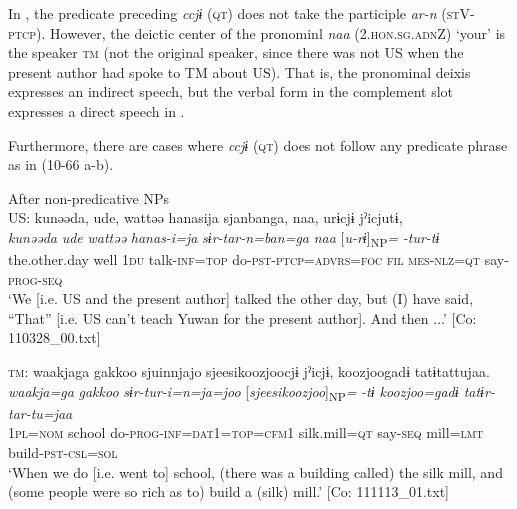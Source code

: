 In , the predicate preceding \textit{ccjɨ} (\textsc{qt}) does not take the participle \textit{ar-n} (\textsc{st}V-\textsc{ptcp}). However, the deictic center of the pronominl \textit{naa} (2.\textsc{hon}.\textsc{sg}.\textsc{adn}Z) ‘your’ is the speaker \textsc{tm} (not the original speaker, since there was not US when the present author had spoke to TM about US). That is, the pronominal deixis expresses an indirect speech, but the verbal form in the complement slot expresses a direct speech in .

  Furthermore, there are cases where \textit{ccjɨ} (\textsc{qt}) does not follow any predicate phrase as in (10-66 a-b).

\ea\label{ex:10.66}   After non-predicative NPs\\
  \ea  US: \glll kunəəda,  ude,  wattəə  hanasija  sjanbanga,   naa,  urɨcjɨ  jˀicjutɨ,\\
      \textit{kunəəda}  \textit{ude}  \textit{wattəə}  \textit{hanas-i=ja}  \textit{sɨr-tar-n=ban=ga}  \textit{naa}  [\textit{u-rɨ}]\textsubscript{NP}\textit{=}  \textit{-tur-tɨ}\\
      the.other.day  well  1\textsc{du}  talk-\textsc{inf}=\textsc{top}  do-\textsc{pst}-\textsc{ptcp}=\textsc{advrs}=\textsc{foc}  \textsc{fil}  \textsc{mes}-\textsc{nlz}=\textsc{qt}  say-\textsc{prog}-\textsc{seq}\\
      \glt       ‘We [i.e. US and the present author] talked the other day, but (I) have said, “That” [i.e. US can’t teach Yuwan for the present author]. And then ...’ [Co: 110328\_00.txt]

  \ex  \textsc{tm}:     \glll    waakjaga  {\textbar}gakkoo{\textbar}  sjuinnjajo  {\textbar}sjeesikoozjoo{\textbar}cjɨ    jˀicjɨ,  {\textbar}koozjoo{\textbar}gadɨ  tatɨtattujaa.\\
      \textit{waakja=ga}  \textit{gakkoo}  \textit{sɨr-tur-i=n=ja=joo}  [\textit{sjeesikoozjoo}]\textsubscript{NP}\textit{=}  \textit{-tɨ  koozjoo=gadɨ  tatɨr-tar-tu=jaa}\\
      1\textsc{pl}=\textsc{nom}  school  do{}-\textsc{prog}-\textsc{inf}=\textsc{dat}1=\textsc{top}=\textsc{cfm}1  silk.mill=\textsc{qt} say-\textsc{seq}  mill=\textsc{lmt}  build-\textsc{pst}-\textsc{csl}=\textsc{sol}\\
      \glt       ‘When we do [i.e. went to] school, (there was a building called) the silk mill, and (some people were so rich as to) build a (silk) mill.’ [Co: 111113\_01.txt]
    \z
\z

